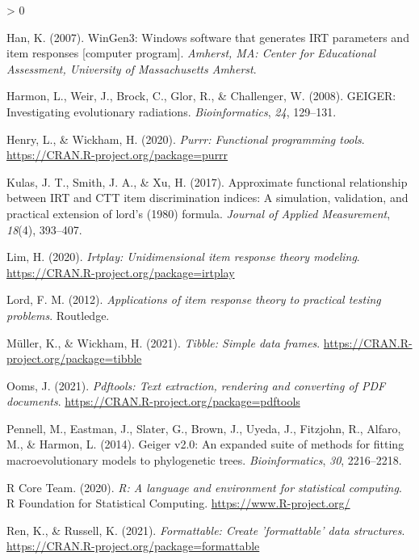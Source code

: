 \documentclass[
  english,
  man]{apa6}
\newlength{\cslhangindent}
\newenvironment{CSLReferences}[2] %
 {%
  \setlength{\parindent}{0pt}
  \ifodd #1 \everypar{\setlength{\hangindent}{\cslhangindent}}\ignorespaces\fi
  \ifnum #2 > 0
  \setlength{\parskip}{#2\baselineskip}
  \fi
 }%
 {}
\begin{document}
\begin{CSLReferences}{1}{0}
\leavevmode\hypertarget{ref-han2007wingen3}{}%
Han, K. (2007). WinGen3: Windows software that generates IRT parameters and item responses {[}computer program{]}. \emph{Amherst, MA: Center for Educational Assessment, University of Massachusetts Amherst}.

\leavevmode\hypertarget{ref-R-geiger_d}{}%
Harmon, L., Weir, J., Brock, C., Glor, R., \& Challenger, W. (2008). GEIGER: Investigating evolutionary radiations. \emph{Bioinformatics}, \emph{24}, 129--131.

\leavevmode\hypertarget{ref-R-purrr}{}%
Henry, L., \& Wickham, H. (2020). \emph{Purrr: Functional programming tools}. \url{https://CRAN.R-project.org/package=purrr}

\leavevmode\hypertarget{ref-kulas2017approximate}{}%
Kulas, J. T., Smith, J. A., \& Xu, H. (2017). Approximate functional relationship between IRT and CTT item discrimination indices: A simulation, validation, and practical extension of lord's (1980) formula. \emph{Journal of Applied Measurement}, \emph{18}(4), 393--407.

\leavevmode\hypertarget{ref-R-irtplay}{}%
Lim, H. (2020). \emph{Irtplay: Unidimensional item response theory modeling}. \url{https://CRAN.R-project.org/package=irtplay}

\leavevmode\hypertarget{ref-lord2012applications}{}%
Lord, F. M. (2012). \emph{Applications of item response theory to practical testing problems}. Routledge.

\leavevmode\hypertarget{ref-R-tibble}{}%
Müller, K., \& Wickham, H. (2021). \emph{Tibble: Simple data frames}. \url{https://CRAN.R-project.org/package=tibble}

\leavevmode\hypertarget{ref-R-pdftools}{}%
Ooms, J. (2021). \emph{Pdftools: Text extraction, rendering and converting of PDF documents}. \url{https://CRAN.R-project.org/package=pdftools}

\leavevmode\hypertarget{ref-R-geiger_e}{}%
Pennell, M., Eastman, J., Slater, G., Brown, J., Uyeda, J., Fitzjohn, R., Alfaro, M., \& Harmon, L. (2014). Geiger v2.0: An expanded suite of methods for fitting macroevolutionary models to phylogenetic trees. \emph{Bioinformatics}, \emph{30}, 2216--2218.

\leavevmode\hypertarget{ref-R-base}{}%
R Core Team. (2020). \emph{R: A language and environment for statistical computing}. R Foundation for Statistical Computing. \url{https://www.R-project.org/}

\leavevmode\hypertarget{ref-R-formattable}{}%
Ren, K., \& Russell, K. (2021). \emph{Formattable: Create 'formattable' data structures}. \url{https://CRAN.R-project.org/package=formattable}


\end{CSLReferences}
\end{document}
